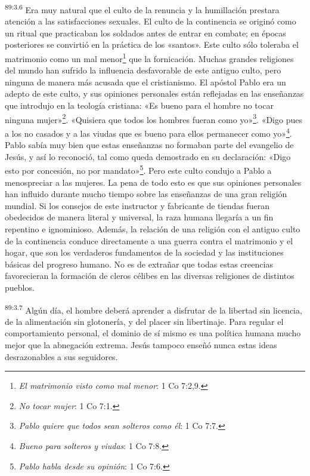 \par
\textsuperscript{89:3.6} Era muy natural que el culto de la renuncia y la humillación prestara atención a las satisfacciones sexuales. El culto de la continencia se originó como un ritual que practicaban los soldados antes de entrar en combate; en épocas posteriores se convirtió en la práctica de los «santos». Este culto sólo toleraba el matrimonio como un mal menor\footnote{\textit{El matrimonio visto como mal menor}: 1 Co 7:2,9.} que la fornicación. Muchas grandes religiones del mundo han sufrido la influencia desfavorable de este antiguo culto, pero ninguna de manera más acusada que el cristianismo. El apóstol Pablo era un adepto de este culto, y sus opiniones personales están reflejadas en las enseñanzas que introdujo en la teología cristiana: «Es bueno para el hombre no tocar ninguna mujer»\footnote{\textit{No tocar mujer}: 1 Co 7:1.}. «Quisiera que todos los hombres fueran como yo»\footnote{\textit{Pablo quiere que todos sean solteros como él}: 1 Co 7:7.}. «Digo pues a los no casados y a las viudas que es bueno para ellos permanecer como yo»\footnote{\textit{Bueno para solteros y viudas}: 1 Co 7:8.}. Pablo sabía muy bien que estas enseñanzas no formaban parte del evangelio de Jesús, y así lo reconoció, tal como queda demostrado en su declaración: «Digo esto por concesión, no por mandato»\footnote{\textit{Pablo habla desde su opinión}: 1 Co 7:6.}. Pero este culto condujo a Pablo a menospreciar a las mujeres. La pena de todo esto es que sus opiniones personales han influido durante mucho tiempo sobre las enseñanzas de una gran religión mundial. Si los consejos de este instructor y fabricante de tiendas fueran obedecidos de manera literal y universal, la raza humana llegaría a un fin repentino e ignominioso. Además, la relación de una religión con el antiguo culto de la continencia conduce directamente a una guerra contra el matrimonio y el hogar, que son los verdaderos fundamentos de la sociedad y las instituciones básicas del progreso humano. No es de extrañar que todas estas creencias favorecieran la formación de cleros célibes en las diversas religiones de distintos pueblos.

\par
\textsuperscript{89:3.7} Algún día, el hombre deberá aprender a disfrutar de la libertad sin licencia, de la alimentación sin glotonería, y del placer sin libertinaje. Para regular el comportamiento personal, el dominio de sí mismo es una política humana mucho mejor que la abnegación extrema. Jesús tampoco enseñó nunca estas ideas desrazonables a sus seguidores.

